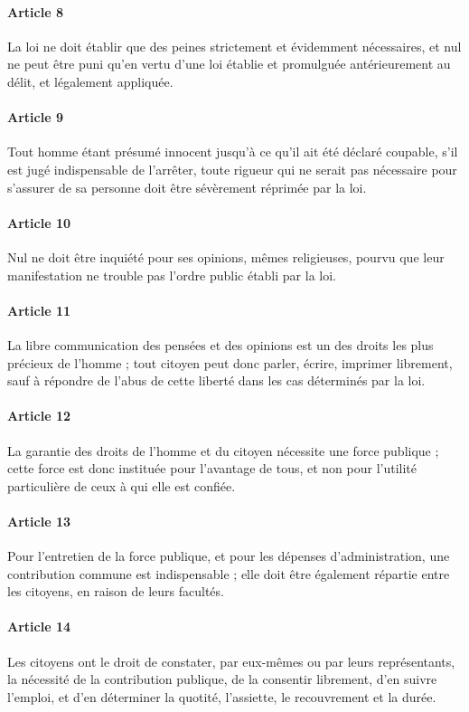 \documentclass[a4paper,10pt]{book}
\begin{document}
\paragraph{Article 8}
La loi ne doit établir que des peines strictement et évidemment nécessaires, 
et nul ne peut être puni qu'en vertu d'une loi établie et promulguée antérieurement au délit, et légalement appliquée.
\paragraph{Article 9}
Tout homme étant présumé innocent jusqu'à ce qu'il ait été déclaré coupable, 
s'il est jugé indispensable de l'arrêter, toute rigueur qui ne serait pas nécessaire 
pour s'assurer de sa personne doit être sévèrement réprimée par la loi.
\paragraph{Article 10}
Nul ne doit être inquiété pour ses opinions, mêmes religieuses, 
pourvu que leur manifestation ne trouble pas l'ordre public établi par la loi.
\paragraph{Article 11}
La libre communication des pensées et des opinions est un des droits les plus 
précieux de l'homme ; tout citoyen peut donc parler, écrire, imprimer librement, 
sauf à répondre de l'abus de cette liberté dans les cas déterminés par la loi.
\paragraph{Article 12}
La garantie des droits de l'homme et du citoyen nécessite une force publique ; 
cette force est donc instituée pour l'avantage de tous, et non pour l'utilité 
particulière de ceux à qui elle est confiée.
\paragraph{Article 13}
Pour l'entretien de la force publique, et pour les dépenses d'administration, 
une contribution commune est indispensable ; elle doit être également répartie 
entre les citoyens, en raison de leurs facultés.
\paragraph{Article 14}
Les citoyens ont le droit de constater, par eux-mêmes ou par leurs représentants, 
la nécessité de la contribution publique, de la consentir librement, d'en suivre 
l'emploi, et d'en déterminer la quotité, l'assiette, le recouvrement et la durée.
\end{document}
